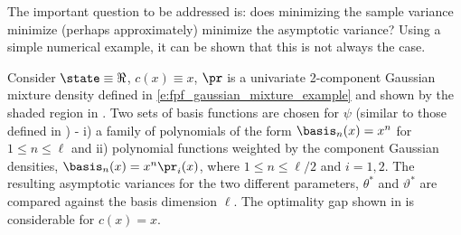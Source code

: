 The important question to be addressed is: does minimizing the sample variance minimize (perhaps approximately) minimize the asymptotic variance? Using a simple numerical example, it can be shown that this is not always the case.

Consider $\state \equiv \Re$, $c(x) \equiv x $, $\pr$ is a univariate 2-component Gaussian mixture density defined in \eqref{e:fpf_gaussian_mixture_example} and shown by the shaded region in . Two sets of basis functions are chosen for $\psi$ (similar to those defined in ) - i) a family of polynomials of the form $\basis_n(x) = x^n$ for $1 \leq n \leq \ell$ and ii) polynomial functions weighted by the component Gaussian densities, $\basis_n(x) = x^n \pr_i(x)$, where $1\leq n \leq \ell/2$ and $i = 1,2$. The resulting asymptotic variances for the two different parameters, $\theta^*$ and $\vartheta^*$ are compared against the basis dimension $\ell$.  The optimality gap shown in  is considerable for $c(x) = x$.
